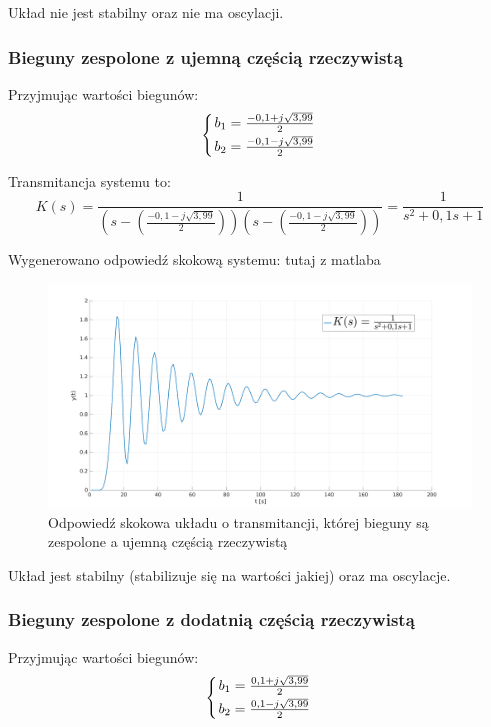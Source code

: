 \documentclass[12pt]{article}
\begin{document}
Układ nie jest stabilny oraz nie ma oscylacji.


\subsubsection{Bieguny zespolone z ujemną częścią rzeczywistą}

Przyjmując wartości biegunów:
\begin{equation*}
    \left\{{{b_1 = \frac{-0,1 + j \sqrt{3,99}}{2}}\atop {b_2 = \frac{-0,1 - j \sqrt{3,99}}{2}}}\right.
\end{equation*}

Transmitancja systemu to:
\begin{equation}
    K(s) = \frac{1}{(s-(\frac{-0,1 - j \sqrt{3,99}}{2}))(s-(\frac{-0,1 - j \sqrt{3,99}}{2}))} = \frac{1}{s^2+0,1s+1}
\end{equation}

Wygenerowano odpowiedź skokową systemu:
\colorbox{WildStrawberry}{tutaj z matlaba}

\begin{figure}[H]
    \centering
    \includegraphics[width=18cm]{zespolone_ujemne.png}
    \caption{Odpowiedź skokowa układu o transmitancji, której bieguny są zespolone a ujemną częścią rzeczywistą}
\end{figure}

Układ jest stabilny (stabilizuje się na wartości \colorbox{WildStrawberry}{jakiej}) oraz ma oscylacje.

\subsubsection{Bieguny zespolone z dodatnią częścią rzeczywistą}

Przyjmując wartości biegunów:
\begin{equation*}
    \left\{{{b_1 = \frac{0,1 + j \sqrt{3,99}}{2}}\atop {b_2 = \frac{0,1 - j \sqrt{3,99}}{2}}}\right.
\end{equation*}
\end{document}
